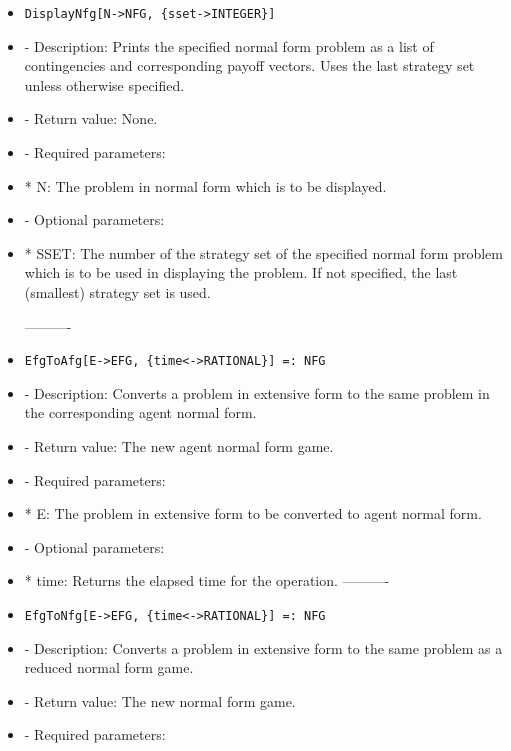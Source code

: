 \begin{itemize}
\item
\begin{verbatim}
DisplayNfg[N->NFG, {sset->INTEGER}]
\end{verbatim}

\bd
\item
- Description:  Prints the specified normal form problem as a list of
contingencies and corresponding payoff vectors.  Uses the last
strategy set unless otherwise specified.
\item
- Return value:  None.
\item
- Required parameters:

\bd	
\item
*  N:  The problem in normal form which is to be displayed.
\ed

\item
- Optional parameters:
	
\bd
\item
*  SSET:  The number of the strategy set of the specified normal form
problem which is to be used in displaying the problem.  If not
specified, the last (smallest) strategy set is used.
\ed

\ed
----------

\item
\begin{verbatim}
EfgToAfg[E->EFG, {time<->RATIONAL}] =: NFG
\end{verbatim}

\bd
\item
- Description:  Converts a problem in extensive form to the same problem
in the corresponding agent normal form.
\item
- Return value:  The new agent normal form game.  
\item 
- Required parameters:

\bd
\item
*  E:  The problem in extensive form to be converted to agent normal form.
\ed

\item
- Optional parameters:
	
\bd
\item
*  time:  Returns the elapsed time for the operation.
\ed
\ed
----------

\item
\begin{verbatim}
EfgToNfg[E->EFG, {time<->RATIONAL}] =: NFG
\end{verbatim}

\bd
\item
- Description:  Converts a problem in extensive form to the same problem
as a reduced normal form game.
\item
- Return value:  The new normal form game.  
\item
- Required parameters:
	

\end{itemize}
